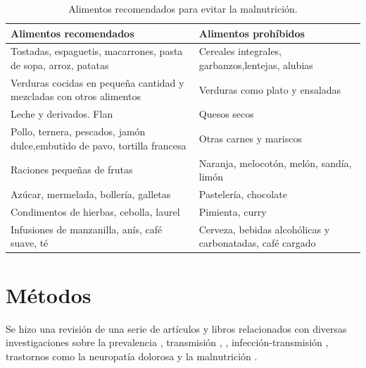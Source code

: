 \documentclass[a4paper,twocolumn,10pt]{article}
\begin{document}
\begin{table}[htb]
\begin{center}
\begin{tabular}{|p{}|p{}|}
\hline \hline
{\cellcolor[gray]{0.7} \bfseries Alimentos recomendados} & {\cellcolor[gray]{0.7} \bfseries  Alimentos prohíbidos} \\ \hline \hline
Tostadas, espaguetis, macarrones, pasta de sopa, arroz, patatas & Cereales integrales, garbanzos,lentejas, alubias \\ \hline
Verduras cocidas en pequeña cantidad y mezcladas con otros alimentos & Verduras como plato y ensaladas \\ \hline
Leche y derivados. Flan & Quesos secos\\ \hline
Pollo, ternera, pescados, jamón dulce,embutido de pavo, tortilla francesa & Otras carnes y mariscos\\ \hline
Raciones pequeñas de frutas & Naranja, melocotón, melón,
sandía, limón \\ \hline
Azúcar, mermelada, bollería, galletas & Pastelería, chocolate \\ \hline
Condimentos de hierbas, cebolla,
laurel & Pimienta, curry \\ \hline
Infusiones de manzanilla, anís,
café suave, té & Cerveza, bebidas alcohólicas
y carbonatadas, café cargado\\ \hline
\end{tabular}
\caption{Alimentos recomendados para evitar la malnutrición. \cite{Herrera2004}}
\label{tabla:Alimentos}
\end{center}
\end{table}
\section{Métodos}
Se hizo una revisión de una serie de artículos y libros relacionados con diversas investigaciones sobre la prevalencia \cite{Marco2012}, transmisión \cite{LinaMariaVera2004}, \cite{Sepulveda-Amor1995}, infección-transmisión \cite{Castillo2004}, trastornos como la neuropatía dolorosa \cite{Ferri2002} y la malnutrición \cite{Herrera2004}. 
\end{document}
